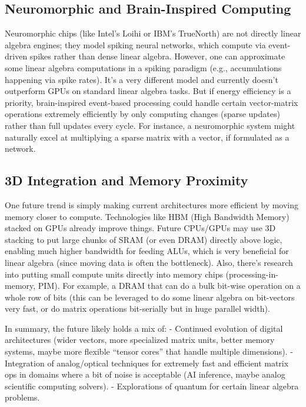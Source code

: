 \subsection{Neuromorphic and Brain-Inspired Computing}  
Neuromorphic chips (like Intel’s Loihi or IBM’s TrueNorth) are not directly linear algebra engines; they model spiking neural networks, which compute via event-driven spikes rather than dense linear algebra. However, one can approximate some linear algebra computations in a spiking paradigm (e.g., accumulations happening via spike rates). It’s a very different model and currently doesn’t outperform GPUs on standard linear algebra tasks. But if energy efficiency is a priority, brain-inspired event-based processing could handle certain vector-matrix operations extremely efficiently by only computing changes (sparse updates) rather than full updates every cycle. For instance, a neuromorphic system might naturally excel at multiplying a sparse matrix with a vector, if formulated as a network.

\subsection{3D Integration and Memory Proximity}  
One future trend is simply making current architectures more efficient by moving memory closer to compute. Technologies like HBM (High Bandwidth Memory) stacked on GPUs already improve things. Future CPUs/GPUs may use 3D stacking to put large chunks of SRAM (or even DRAM) directly above logic, enabling much higher bandwidth for feeding ALUs, which is very beneficial for linear algebra (since moving data is often the bottleneck). Also, there’s research into putting small compute units directly into memory chips (processing-in-memory, PIM). For example, a DRAM that can do a bulk bit-wise operation on a whole row of bits (this can be leveraged to do some linear algebra on bit-vectors very fast, or do matrix operations bit-serially but in huge parallel width).

In summary, the future likely holds a mix of:
- Continued evolution of digital architectures (wider vectors, more specialized matrix units, better memory systems, maybe more flexible “tensor cores” that handle multiple dimensions).
- Integration of analog/optical techniques for extremely fast and efficient matrix ops in domains where a bit of noise is acceptable (AI inference, maybe analog scientific computing solvers).
- Explorations of quantum for certain linear algebra problems.

